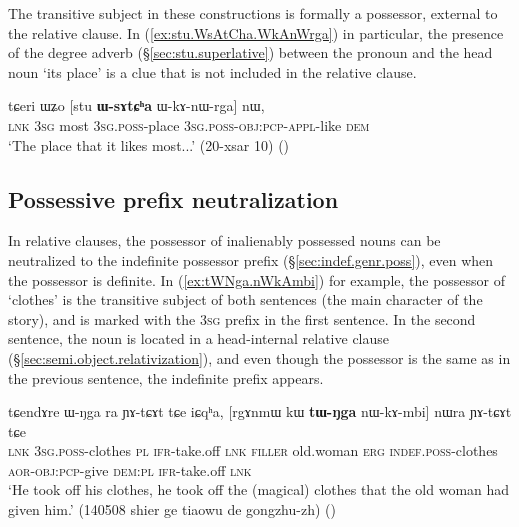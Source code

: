 The transitive subject in these constructions is formally a possessor, external to the relative clause. In (\ref{ex:stu.WsAtCha.WkAnWrga}) in particular, the presence of the degree adverb  (§\ref{sec:stu.superlative}) between the pronoun  and the head noun  `its place' is a clue that  is not included in the relative clause.

\begin{exe}
\ex \label{ex:stu.WsAtCha.WkAnWrga}
\gll  tɕeri ɯʑo [stu \textbf{ɯ-sɤtɕʰa} ɯ-kɤ-nɯ-rga] nɯ, \\
\textsc{lnk} \textsc{3sg} most \textsc{3sg}.\textsc{poss}-place \textsc{3sg}.\textsc{poss}-\textsc{obj}:\textsc{pcp}-\textsc{appl}-like \textsc{dem} \\
\glt `The place that it likes most...' (20-xsar 10)
()
\end{exe}

\subsection{Possessive prefix neutralization} \label{sec:relative.possessor.neutralization}
In relative clauses, the possessor of inalienably possessed nouns can be neutralized to the indefinite possessor prefix  (§\ref{sec:indef.genr.poss}), even when the possessor is definite. In (\ref{ex:tWNga.nWkAmbi}) for example, the possessor of  `clothes' is the transitive subject of both sentences (the main character of the story), and is marked with the \textsc{3sg} prefix  in the first sentence. In the second sentence, the noun  is located in a head-internal relative clause (§\ref{sec:semi.object.relativization}), and even though the possessor is the same as in the previous sentence, the indefinite prefix  appears.  
 
\begin{exe}
\ex \label{ex:tWNga.nWkAmbi}
\gll tɕendɤre ɯ-ŋga ra ɲɤ-tɕɤt tɕe iɕqʰa,  [rgɤnmɯ kɯ \textbf{tɯ-ŋga} nɯ-kɤ-mbi] nɯra ɲɤ-tɕɤt tɕe   \\
\textsc{lnk} \textsc{3sg}.\textsc{poss}-clothes \textsc{pl} \textsc{ifr}-take.off \textsc{lnk} \textsc{filler} old.woman \textsc{erg} \textsc{indef}.\textsc{poss}-clothes \textsc{aor}-\textsc{obj}:\textsc{pcp}-give \textsc{dem}:\textsc{pl} \textsc{ifr}-take.off \textsc{lnk} \\
\glt `He took off his clothes, he took off the (magical) clothes that the old woman had given him.' (140508 shier ge tiaowu de gongzhu-zh)
()
\end{exe}

